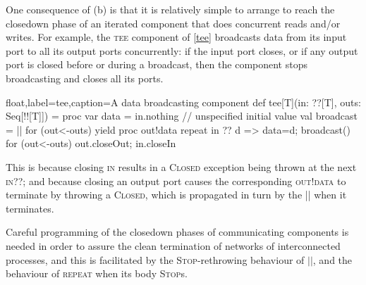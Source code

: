 \documentclass[12pt]{IOS-Book-Article-CPA-2017}
\begin{document}
One consequence of (b) is that it is relatively simple to arrange
to reach the closedown phase of an iterated component that does
concurrent reads and/or writes. 
%
For example, the \textsc{tee} component of \Listing \ref{tee} broadcasts
data from its input port to all its output ports concurrently: if
the input port closes, or if any output port is closed 
before or during a broadcast, then the component stops
broadcasting and closes all its ports.

\begin{code+}[...]{float,label=tee,caption={A data broadcasting component}}
   def tee[T](in: ??[T], outs: Seq[!![T]]) =
   proc { var data      = in.nothing  // unspecified initial value
          val broadcast = || for (out<-outs) yield proc { out!data }
          repeat { in ?? { d => { data=d;  broadcast() }}}
          for (out<-outs) out.closeOut; in.closeIn
        }
\end{code+}

This is because closing \textsc{in} results in a \textsc{Closed} exception 
being thrown at the next \textsc{in??}; and because closing an
output port causes the corresponding \textsc{out!data} to 
terminate by throwing a \textsc{Closed}, which is
propagated in turn by the \textsc{||} when it terminates.

Careful programming of the closedown phases of communicating components
is needed in order to assure the clean termination of networks
of interconnected processes, and this is facilitated by the \textsc{Stop}-rethrowing behaviour
of $||$, and the behaviour of \textsc{repeat} when its body \textsc{Stop}s.
\end{document}
